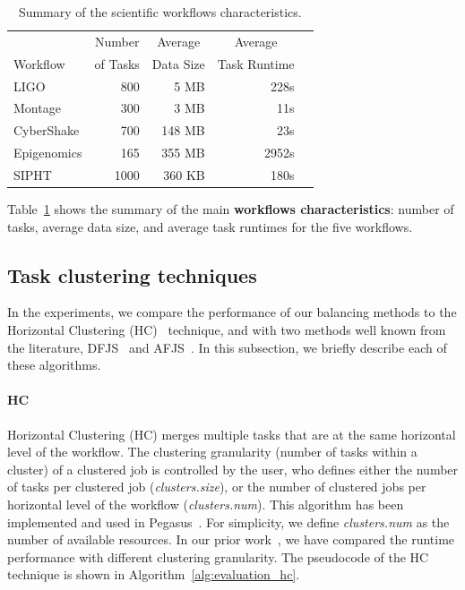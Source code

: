 \documentclass[final,5p,times,twocolumn]{elsarticle}
\begin{document}
\begin{table}[!htb]
	\setlength{\tabcolsep}{11pt}
	\centering
	\small
	\begin{tabular}{lrrrr}
		\hline
		 & \multicolumn{1}{c}{Number} & \multicolumn{1}{c}{Average} &  \multicolumn{1}{c}{Average} \\
		Workflow	& of Tasks	 & Data Size & Task Runtime \\
		\hline
		LIGO 		&800		& 5 MB	& 228s\\
		Montage 		&300		&3 MB	&11s\\
		CyberShake 	&700		&148 MB 	& 23s\\
		Epigenomics 	&165 	& 355 MB	& 2952s\\
		SIPHT		&1000	& 360 KB 	& 180s\\
		\hline
	\end{tabular}
	\caption{Summary of the scientific workflows characteristics.}
	\label{tab:evaluation_workflows}
\end{table} 

Table~\ref{tab:evaluation_workflows} shows the summary of the main \textbf{workflows characteristics}: number of tasks, average data size, and average task runtimes for the five workflows. 


\subsection{Task clustering techniques}

In the experiments, we compare the performance of our balancing methods to the Horizontal Clustering (HC)~\cite{Singh:2008:WTC:1341811.1341822} technique, and with two methods well known from the literature, DFJS~\cite{Muthuvelu:2005:DJG:1082290.1082297} and AFJS~\cite{Liu2009}. In this subsection, we briefly describe each of these algorithms.


\paragraph{\textbf{HC}}
Horizontal Clustering (HC) merges multiple tasks that are at the same horizontal level of the workflow. The clustering granularity (number of tasks within a cluster) of a clustered job is controlled by the user, who defines either the number of tasks per clustered job (\emph{clusters.size}), or the number of clustered jobs per horizontal level of the workflow (\emph{clusters.num}). This algorithm has been implemented and used in Pegasus~\cite{Singh:2008:WTC:1341811.1341822}. For simplicity, we define \emph{clusters.num} as the number of available resources. In our prior work~\cite{6683907}, we have compared the runtime performance with different clustering granularity. The pseudocode of the HC technique is shown in Algorithm~\ref{alg:evaluation_hc}. 
\end{document}

